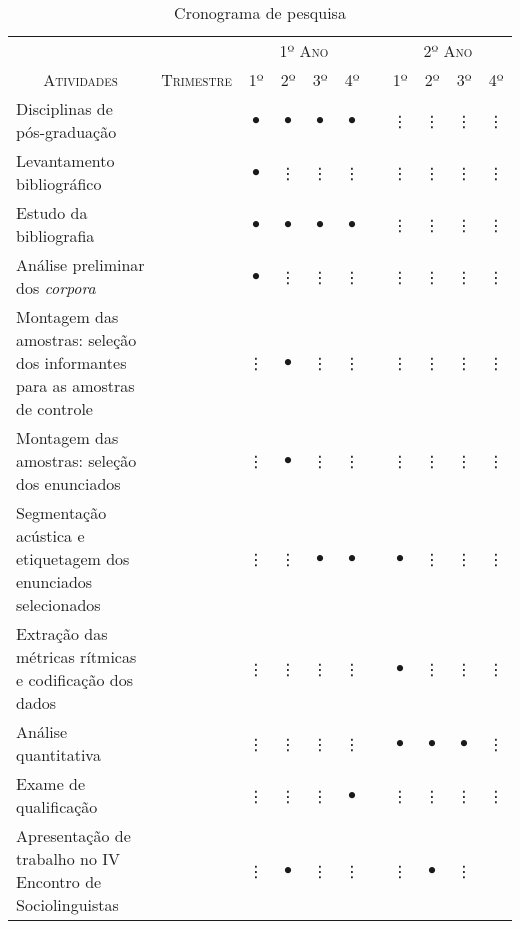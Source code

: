 \documentclass[
	a4paper,	%
	12pt,		%
	]{article}	%
\begin{document}
\begin{table}[h!]
	\vspace{1em}
	\caption{\rmfamily Cronograma de pesquisa}
	\vspace{.5em}
	\label{tab-crono}
	\begin{tabular}{m{.40\linewidth}cccccccccc}
		&& \multicolumn{4}{c}{\scshape\normalsize 1º Ano} &&
		\multicolumn{4}{c}{\scshape\normalsize 2º Ano} \\
		\cline{3-6}\cline{8-11}
		\multicolumn{1}{c}{\scshape\normalsize Atividades}&
		\scshape\normalsize Trimestre &\scshape\normalsize  1º
		&\scshape\normalsize  2º &\scshape\normalsize  3º
		&\scshape\normalsize  4º &\scshape\normalsize  &\scshape\normalsize
		1º &\scshape\normalsize  2º &\scshape\normalsize  3º &\scshape\normalsize  4º \\
		\hline
		\hline
		Disciplinas de pós-graduação
		&&$\bullet$&$\bullet$&$\bullet$&$\bullet$ &&\vdots&\vdots&\vdots &\vdots \\  
		\rowcolor{cinza1}
		Levantamento bibliográfico
		&&$\bullet$&\vdots&\vdots&\vdots&&\vdots&\vdots&\vdots&\vdots \\  
		Estudo da bibliografia &&$\bullet$&$\bullet$&$\bullet$&$\bullet$&&\vdots&\vdots&\vdots &\vdots \\  
		\rowcolor{cinza1}
		Análise preliminar dos \emph{corpora}
		&&$\bullet$&\vdots&\vdots&\vdots&&\vdots&\vdots&\vdots &\vdots \\  
		Montagem das amostras: seleção dos informantes para as amostras de
		controle &&\vdots&$\bullet$&\vdots&\vdots&&\vdots&\vdots&\vdots &\vdots \\  
		\rowcolor{cinza1}
		Montagem das amostras: seleção dos enunciados &&\vdots&$\bullet$&\vdots&\vdots&&\vdots&\vdots&\vdots &\vdots \\  
		Segmentação acústica e etiquetagem dos enunciados selecionados
		&&\vdots&\vdots&$\bullet$&$\bullet$&&$\bullet$&\vdots&\vdots &\vdots \\  	
		\rowcolor{cinza1}
		Extração das métricas rítmicas e codificação dos dados &&\vdots&\vdots&\vdots&\vdots&&$\bullet$&\vdots&\vdots &\vdots \\  
		Análise quantitativa &&\vdots&\vdots&\vdots&\vdots&&$\bullet$&$\bullet$&$\bullet$ &\vdots \\  
		\rowcolor{cinza1}
		Exame de qualificação &&\vdots&\vdots&\vdots&$\bullet$&&\vdots&\vdots&\vdots &\vdots \\  
		Apresentação de trabalho no IV Encontro de Sociolinguistas &&\vdots&$\bullet$&\vdots&\vdots&&\vdots&$\bullet$&\vdots

\end{tabular}
\end{table}
\end{document}
